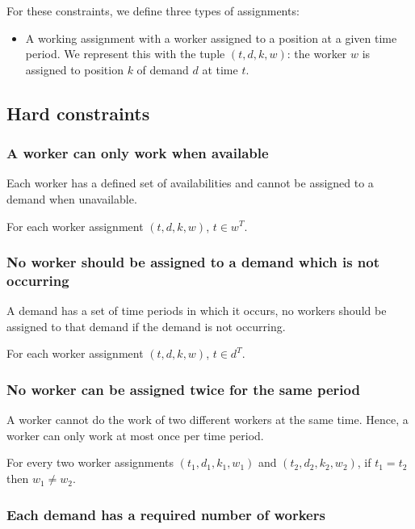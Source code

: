 \documentclass[../thesis.tex]{subfiles}
\begin{document}
For these constraints, we define three types of assignments:

\begin{itemize}
  \item A working assignment with a worker assigned to a position at a given time period.
  We represent this with the tuple $(t, d, k, w)$: the worker $w$ is assigned to position $k$ of demand $d$ at time $t$.
\end{itemize}

\subsection{Hard constraints}

\subsubsection{A worker can only work when available}

Each worker has a defined set of availabilities and cannot be assigned to a demand when 
unavailable.

For each worker assignment $(t, d, k, w)$, $t \in w^T$.

\subsubsection{No worker should be assigned to a demand which is not occurring}

A demand has a set of time periods in which it occurs,
no workers should be assigned to that demand if the demand is not 
occurring. 

For each worker assignment $(t, d, k, w)$, $t \in d^T$.

\subsubsection{No worker can be assigned twice for the same period} 

A worker cannot do the work of two different workers at the same time.
Hence, a worker can only work at most once per time period.

For every two worker assignments $(t_1, d_1, k_1, w_1)$ and $(t_2, d_2, k_2, w_2)$, if $t_1 = t_2$ then $w_1 \neq w_2$.

\subsubsection{Each demand has a required number of workers}
\end{document}
